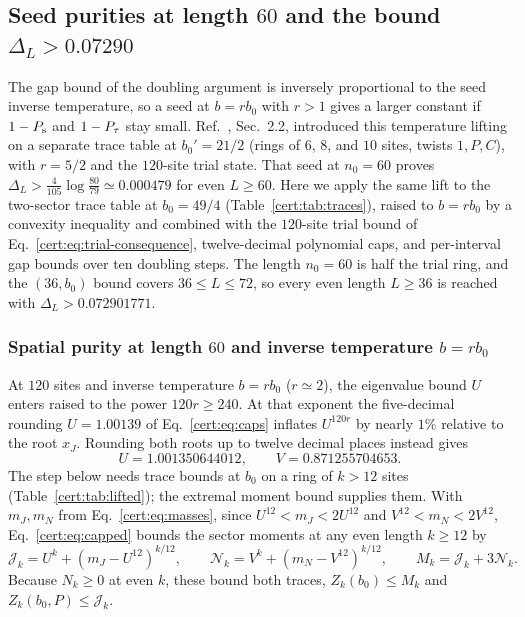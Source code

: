 \subsection{Seed purities at length $60$ and the bound $\Delta_L>0.07290$}
\label{cert:sec:lifting}

The gap bound of the doubling argument is inversely proportional to the
seed inverse temperature, so a seed at $b=rb_0$ with $r>1$ gives a larger constant if
$1-P_{\mathrm s}$ and $1-P_{\tau}$ stay small. Ref.~\cite{OpenAI2026Periodic}, Sec.~2.2,
introduced this temperature lifting on a separate trace table at
$b_0'=21/2$ (rings of $6$, $8$, and $10$ sites, twists $1,P,C$), with $r=5/2$
and the $120$-site trial state. That seed at $n_0=60$ proves
$\Delta_L>\frac{4}{105}\log\frac{80}{79}\simeq0.000479$ for even
$L\ge60$. Here we apply the same lift to the two-sector trace table at
$b_0=49/4$ (Table~\ref{cert:tab:traces}), raised to $b=rb_0$ by a
convexity inequality and combined with the $120$-site trial bound of
Eq.~\eqref{cert:eq:trial-consequence}, twelve-decimal polynomial caps,
and per-interval gap bounds over ten doubling steps. The length $n_0=60$
is half the trial ring, and the $(36,b_0)$ bound covers $36\le L\le72$,
so every even length $L\ge36$ is reached with $\Delta_L>0.072901771$.

\subsubsection{Spatial purity at length $60$ and inverse temperature $b=rb_0$}
\label{cert:sec:lifted-moments}

At $120$ sites and inverse temperature $b=rb_0$ ($r\simeq2$), the
eigenvalue bound $U$ enters raised to the power $120r\ge240$. At that
exponent the five-decimal rounding $U=1.00139$ of Eq.~\eqref{cert:eq:caps}
inflates $U^{120r}$ by nearly $1\%$ relative to the root $x_J$. Rounding
both roots up to twelve decimal places instead gives
\begin{equation}
    U=1.001350644012,\qquad V=0.871255704653.
    \label{cert:eq:tight-caps}
\end{equation}
The step below needs trace bounds at $b_0$ on a ring of $k>12$ sites
(Table~\ref{cert:tab:lifted}); the extremal moment bound supplies them.
With $m_J,m_N$ from Eq.~\eqref{cert:eq:masses}, since
$U^{12}<m_J<2U^{12}$ and $V^{12}<m_N<2V^{12}$, Eq.~\eqref{cert:eq:capped}
bounds the sector moments at any even length $k\ge12$ by
\begin{equation}
    \mathcal J_k=U^k+(m_J-U^{12})^{k/12},\qquad
    \mathcal N_k=V^k+(m_N-V^{12})^{k/12},\qquad
    M_k=\mathcal J_k+3\mathcal N_k.
    \label{cert:eq:moment-upper}
\end{equation}
Because $N_k\ge0$ at even $k$, these bound both traces,
$Z_k(b_0)\le M_k$ and $Z_k(b_0,P)\le\mathcal J_k$.

